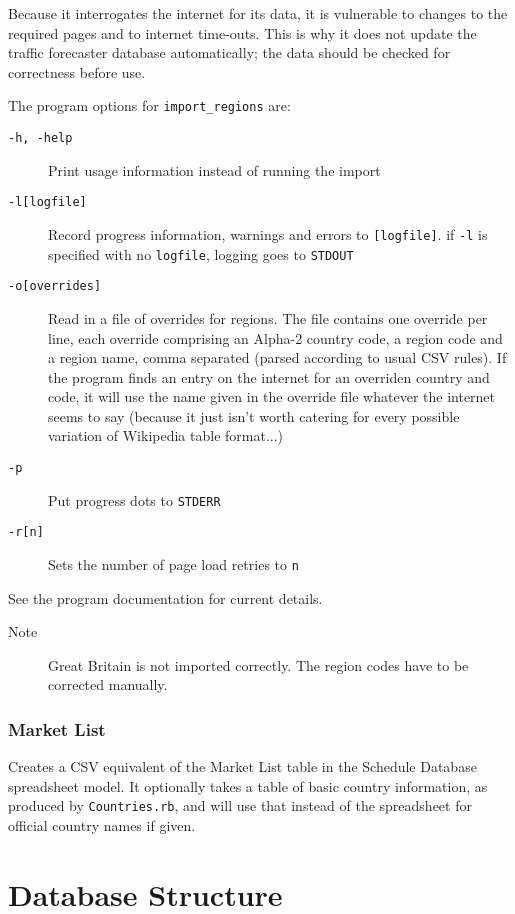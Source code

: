 \documentclass[]{report}
\begin{document}
Because it interrogates the internet for its data, it is vulnerable to changes to the required pages and to internet time-outs. This is why it does not update the traffic forecaster database automatically; the data should be checked for correctness before use.

The program options for \texttt{import\_regions} are:
\begin{description}
\item[\texttt{-h, -help}] Print usage information instead of running the import
\item[\texttt{-l[logfile]}] Record progress information, warnings and errors to \texttt{[logfile]}. if \texttt{-l} is specified with no \texttt{logfile}, logging goes to \texttt{STDOUT}
\item[\texttt{-o[overrides]}] Read in a file of overrides for regions. The file contains one override per line, each override comprising an Alpha-2 country code, a region code and a region name, comma separated (parsed according to usual CSV rules). If the program finds an entry on the internet for an overriden country and code, it will use the name given in the override file whatever the internet seems to say (because it just isn't worth catering for every possible variation of Wikipedia table format...)
\item[\texttt{-p}] Put progress dots to \texttt{STDERR}
\item[\texttt{-r[n]}] Sets the number of page load retries to \texttt{n}
\end{description}

See the program documentation for current details.

\begin{description}
\item[Note]Great Britain is not imported correctly. The region codes have to be corrected manually.
\end{description}
\subsection{Market List}
Creates a CSV equivalent of the Market List table in the Schedule Database spreadsheet model. It optionally takes a table of basic country information, as produced by \verb|Countries.rb|, and will use that instead of the spreadsheet for official country names if given.
\chapter{Database Structure}
\end{document}
